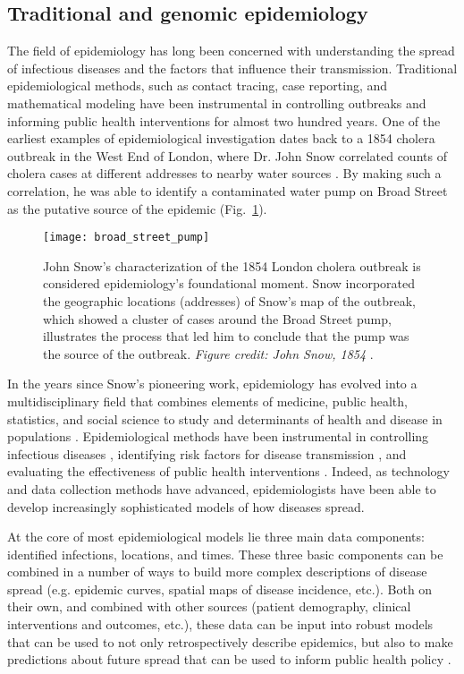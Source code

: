 \subsection{Traditional and genomic epidemiology}\label{sec:tradVsGenEpi}
The field of epidemiology has long been concerned with understanding the spread of infectious diseases and the factors that influence their transmission.
Traditional epidemiological methods, such as contact tracing, case reporting, and mathematical modeling have been instrumental in controlling outbreaks and informing public health interventions for almost two hundred years.
One of the earliest examples of epidemiological investigation dates back to a 1854 cholera outbreak in the West End of London, where Dr. John Snow correlated counts of cholera cases at different addresses to nearby water sources \citep{snow1856mode2}.
By making such a correlation, he was able to identify a contaminated water pump on Broad Street as the putative source of the epidemic (Fig.~\ref{fig:broadStreetPump}).

\begin{figure}[ht]
  \centering
  \texttt{[image: broad\_street\_pump]}
  \caption[John Snow's map of the 1854 Broad Street cholera outbreak in London]{John Snow's characterization of the 1854 London cholera outbreak is considered epidemiology's foundational moment. Snow incorporated the geographic locations (addresses) of Snow's map of the outbreak, which showed a cluster of cases around the Broad Street pump, illustrates the process that led him to conclude that the pump was the source of the outbreak. \textit{Figure credit: John Snow, 1854} \citep{snow1854mode}.}
  \label{fig:broadStreetPump}
\end{figure}

In the years since Snow's pioneering work, epidemiology has evolved into a multidisciplinary field that combines elements of medicine, public health, statistics, and social science to study and determinants of health and disease in populations \citep{rothman2024epidemiology}.
Epidemiological methods have been instrumental in controlling infectious diseases \citep{singh2017rabies}, identifying risk factors for disease transmission \citep{chen2007sexual}, and evaluating the effectiveness of public health interventions \citep{alfano2020efficacy}.
Indeed, as technology and data collection methods have advanced, epidemiologists have been able to develop increasingly sophisticated models of how diseases spread.

At the core of most epidemiological models lie three main data components: identified infections, locations, and times.
These three basic components can be combined in a number of ways to build more complex descriptions of disease spread (e.g. epidemic curves, spatial maps of disease incidence, etc.).
Both on their own, and combined with other sources (patient demography, clinical interventions and outcomes, etc.), these data can be input into robust models that can be used to not only retrospectively describe epidemics, but also to make predictions about future spread that can be used to inform public health policy \citep{colon2021probabilistic}.


